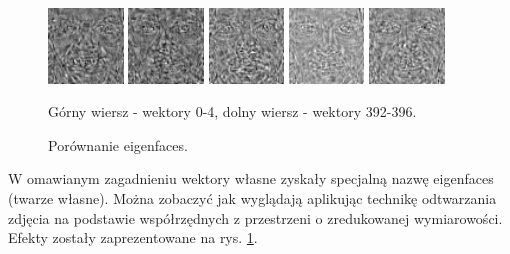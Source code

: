 \documentclass[oneside, eng]{mgr}
\begin{document}
\begin{figure}
	\begin{minipage}{2cm}
		\includegraphics[width=2cm]{392.jpg}
	\end{minipage}
	\begin{minipage}{2cm}
		\includegraphics[width=2cm]{393.jpg}
	\end{minipage}
	\begin{minipage}{2cm}
		\includegraphics[width=2cm]{394.jpg}
	\end{minipage}
	\begin{minipage}{2cm}
		\includegraphics[width=2cm]{395.jpg}
	\end{minipage}
	\begin{minipage}{2cm}
		\includegraphics[width=2cm]{396.jpg}
	\end{minipage}
	
	\caption{Porównanie eigenfaces.}
Górny wiersz - wektory 0-4, dolny wiersz - wektory 392-396.
	\label{fig:eigenfaces}
\end{figure}

W omawianym zagadnieniu wektory własne zyskały specjalną nazwę eigenfaces (twarze własne). Można zobaczyć jak wyglądają aplikując technikę odtwarzania zdjęcia na podstawie współrzędnych z przestrzeni o zredukowanej wymiarowości. Efekty zostały zaprezentowane na rys. \ref{fig:eigenfaces}. 
\end{document}
